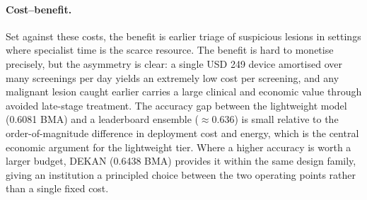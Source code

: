 \paragraph{Cost--benefit.}
Set against these costs, the benefit is earlier triage of suspicious lesions
in settings where specialist time is the scarce resource. The benefit is hard
to monetise precisely, but the asymmetry is clear: a single USD 249 device
amortised over many screenings per day yields an extremely low cost per
screening, and any malignant lesion caught earlier carries a large clinical
and economic value through avoided late-stage treatment. The accuracy gap
between the lightweight model (0.6081 BMA) and a leaderboard ensemble
($\approx$0.636) is small relative to the order-of-magnitude difference in
deployment cost and energy, which is the central economic argument for the
lightweight tier. Where a higher accuracy is worth a larger budget, DEKAN
(0.6438 BMA) provides it within the same design family, giving an institution
a principled choice between the two operating points rather than a single
fixed cost.
